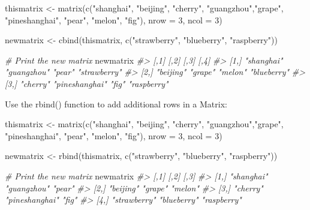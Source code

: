 \documentclass[
]{book}
\newenvironment{Shaded}{\begin{snugshade}}{\end{snugshade}}
\newcommand{\AttributeTok}[1]{\textcolor[rgb]{0.77,0.63,0.00}{#1}}
\newcommand{\CommentTok}[1]{\textcolor[rgb]{0.56,0.35,0.01}{\textit{#1}}}
\newcommand{\DecValTok}[1]{\textcolor[rgb]{0.00,0.00,0.81}{#1}}
\newcommand{\FunctionTok}[1]{\textcolor[rgb]{0.00,0.00,0.00}{#1}}
\newcommand{\NormalTok}[1]{#1}
\newcommand{\OtherTok}[1]{\textcolor[rgb]{0.56,0.35,0.01}{#1}}
\newcommand{\StringTok}[1]{\textcolor[rgb]{0.31,0.60,0.02}{#1}}
\begin{document}
\begin{Shaded}
\begin{Highlighting}[]
\NormalTok{thismatrix }\OtherTok{\textless{}{-}} \FunctionTok{matrix}\NormalTok{(}\FunctionTok{c}\NormalTok{(}\StringTok{"shanghai"}\NormalTok{, }\StringTok{"beijing"}\NormalTok{, }\StringTok{"cherry"}\NormalTok{, }\StringTok{"guangzhou"}\NormalTok{,}\StringTok{"grape"}\NormalTok{, }\StringTok{"pineshanghai"}\NormalTok{, }\StringTok{"pear"}\NormalTok{, }\StringTok{"melon"}\NormalTok{, }\StringTok{"fig"}\NormalTok{), }\AttributeTok{nrow =} \DecValTok{3}\NormalTok{, }\AttributeTok{ncol =} \DecValTok{3}\NormalTok{)}

\NormalTok{newmatrix }\OtherTok{\textless{}{-}} \FunctionTok{cbind}\NormalTok{(thismatrix, }\FunctionTok{c}\NormalTok{(}\StringTok{"strawberry"}\NormalTok{, }\StringTok{"blueberry"}\NormalTok{, }\StringTok{"raspberry"}\NormalTok{))}

\CommentTok{\# Print the new matrix}
\NormalTok{newmatrix}
\CommentTok{\#\textgreater{}      [,1]       [,2]           [,3]    [,4]        }
\CommentTok{\#\textgreater{} [1,] "shanghai" "guangzhou"    "pear"  "strawberry"}
\CommentTok{\#\textgreater{} [2,] "beijing"  "grape"        "melon" "blueberry" }
\CommentTok{\#\textgreater{} [3,] "cherry"   "pineshanghai" "fig"   "raspberry"}
\end{Highlighting}
\end{Shaded}

Use the rbind() function to add additional rows in a Matrix:

\begin{Shaded}
\begin{Highlighting}[]
\NormalTok{thismatrix }\OtherTok{\textless{}{-}} \FunctionTok{matrix}\NormalTok{(}\FunctionTok{c}\NormalTok{(}\StringTok{"shanghai"}\NormalTok{, }\StringTok{"beijing"}\NormalTok{, }\StringTok{"cherry"}\NormalTok{, }\StringTok{"guangzhou"}\NormalTok{,}\StringTok{"grape"}\NormalTok{, }\StringTok{"pineshanghai"}\NormalTok{, }\StringTok{"pear"}\NormalTok{, }\StringTok{"melon"}\NormalTok{, }\StringTok{"fig"}\NormalTok{), }\AttributeTok{nrow =} \DecValTok{3}\NormalTok{, }\AttributeTok{ncol =} \DecValTok{3}\NormalTok{)}

\NormalTok{newmatrix }\OtherTok{\textless{}{-}} \FunctionTok{rbind}\NormalTok{(thismatrix, }\FunctionTok{c}\NormalTok{(}\StringTok{"strawberry"}\NormalTok{, }\StringTok{"blueberry"}\NormalTok{, }\StringTok{"raspberry"}\NormalTok{))}

\CommentTok{\# Print the new matrix}
\NormalTok{newmatrix}
\CommentTok{\#\textgreater{}      [,1]         [,2]           [,3]       }
\CommentTok{\#\textgreater{} [1,] "shanghai"   "guangzhou"    "pear"     }
\CommentTok{\#\textgreater{} [2,] "beijing"    "grape"        "melon"    }
\CommentTok{\#\textgreater{} [3,] "cherry"     "pineshanghai" "fig"      }
\CommentTok{\#\textgreater{} [4,] "strawberry" "blueberry"    "raspberry"}
\end{Highlighting}
\end{Shaded}
\end{document}
